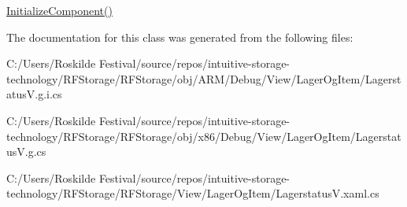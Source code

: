 \mbox{\hyperlink{class_r_f_storage_1_1_view_1_1_lager_og_item_1_1_lagerstatus_v_a1c5ef5b6d4087715c569466b9fc5dfbc}{Initialize\+Component()}} 



The documentation for this class was generated from the following files\+:\begin{DoxyCompactItemize}
\item 
C\+:/\+Users/\+Roskilde Festival/source/repos/intuitive-\/storage-\/technology/\+R\+F\+Storage/\+R\+F\+Storage/obj/\+A\+R\+M/\+Debug/\+View/\+Lager\+Og\+Item/Lagerstatus\+V.\+g.\+i.\+cs\item 
C\+:/\+Users/\+Roskilde Festival/source/repos/intuitive-\/storage-\/technology/\+R\+F\+Storage/\+R\+F\+Storage/obj/x86/\+Debug/\+View/\+Lager\+Og\+Item/Lagerstatus\+V.\+g.\+cs\item 
C\+:/\+Users/\+Roskilde Festival/source/repos/intuitive-\/storage-\/technology/\+R\+F\+Storage/\+R\+F\+Storage/\+View/\+Lager\+Og\+Item/Lagerstatus\+V.\+xaml.\+cs\end{DoxyCompactItemize}
